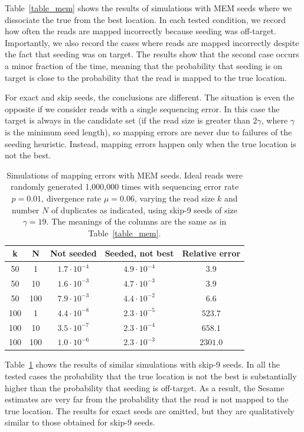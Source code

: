 \documentclass{article}
\begin{document}
Table~\ref{table_mem} shows the results of simulations with MEM seeds
where we dissociate the true from the best location. In each tested
condition, we record how often the reads are mapped incorrectly because
seeding was off-target. Importantly, we also record the cases where reads
are mapped incorrectly despite the fact that seeding was on target. The
results show that the second case occurs a minor fraction of the time,
meaning that the probability that seeding is on target is close to the
probability that the read is mapped to the true location.

For exact and skip seeds, the conclusions are different. The situation is
even the opposite if we consider reads with a single sequencing error. In
this case the target is always in the candidate set (if the read size is
greater than $2\gamma$, where $\gamma$ is the minimum seed length), so
mapping errors are never due to failures of the seeding heuristic.
Instead, mapping errors happen only when the true location is not the
best.

\begin{table}
\renewcommand{\arraystretch}{1.1}
\centering
\begin{tabular}{ccccc}
k & N & Not seeded & Seeded, not best & Relative error \\
\hline
50  &  1  & $1.7 \cdot 10^{-4}$ & $4.9 \cdot 10^{-4}$ & $3.9$ \\
50  & 10  & $1.6 \cdot 10^{-3}$ & $4.7 \cdot 10^{-3}$ & $3.9$ \\
50  & 100 & $7.9 \cdot 10^{-3}$ & $4.4 \cdot 10^{-2}$ & $6.6$ \\
100 &  1  & $4.4 \cdot 10^{-8}$ & $2.3 \cdot 10^{-5}$ & $523.7$ \\
100 & 10  & $3.5 \cdot 10^{-7}$ & $2.3 \cdot 10^{-4}$ & $658.1$ \\
100 & 100 & $1.0 \cdot 10^{-6}$ & $2.3 \cdot 10^{-3}$ & $2301.0$
\end{tabular}
\caption{Simulations of mapping errors with MEM seeds. Ideal reads were
randomly generated 1,000,000 times with sequencing error rate $p = 0.01$,
divergence rate $\mu = 0.06$, varying the read size $k$ and number $N$ of
duplicates as indicated, using skip-9 seeds of size $\gamma = 19$. The
meanings of the columns are the same as in Table~\ref{table_mem}.}
\label{table_skip}
\end{table}

Table~\ref{table_skip} shows the results of similar simulations with
skip-9 seeds. In all the tested cases the probability that the true
location is not the best is substantially higher than the probability that
seeding is off-target. As a result, the Sesame estimates are very far from
the probability that the read is not mapped to the true location.
The results for exact seeds are omitted, but they are qualitatively
similar to those obtained for skip-9 seeds.
\end{document}
